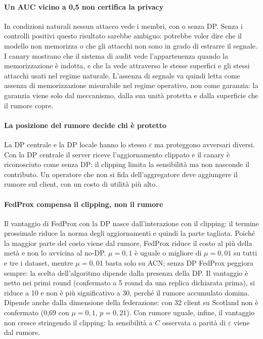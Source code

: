 \paragraph{Un AUC vicino a 0,5 non certifica la privacy}
In condizioni naturali nessun attacco vede i membri, con o senza DP. Senza i controlli positivi
questo risultato sarebbe ambiguo: potrebbe voler dire che il modello non memorizza o che gli
attacchi non sono in grado di estrarre il segnale. I canary mostrano che il sistema di audit
vede l'appartenenza quando la memorizzazione è indotta, e che la vede attraverso le stesse
superfici e gli stessi attacchi usati nel regime naturale. L'assenza di segnale va quindi letta
come assenza di memorizzazione misurabile nel regime operativo, non come garanzia: la garanzia
viene solo dal meccanismo, dalla sua unità protetta e dalla superficie che il rumore copre.

\paragraph{La posizione del rumore decide chi è protetto}
La DP centrale e la DP locale hanno lo stesso $\varepsilon$ ma proteggono avversari diversi.
Con la DP centrale il server riceve l'aggiornamento clippato e il canary è riconosciuto come
senza DP: il clipping limita la sensibilità ma non nasconde il contributo. Un operatore che
non si fida dell'aggregatore deve aggiungere il rumore sul client, con un costo di utilità
più alto.

\paragraph{FedProx compensa il clipping, non il rumore}
Il vantaggio di FedProx con la DP nasce dall'interazione con il clipping: il termine
prossimale riduce la norma degli aggiornamenti e quindi la parte tagliata. Poiché la maggior
parte del costo viene dal rumore, FedProx riduce il costo al più della metà e non lo avvicina
al no-DP. $\mu=0{,}1$ è uguale o migliore di $\mu=0{,}01$ su tutti e tre i dataset, mentre
$\mu=0{,}01$ basta solo su ACN; senza DP FedProx peggiora sempre: la scelta dell'algoritmo
dipende dalla presenza della DP. Il vantaggio è netto nei primi round (confermato a 5 round da
una replica dichiarata prima), si riduce a 10 e non è più significativo a 30, perché il rumore
accumulato domina. Dipende anche dalla dimensione della federazione: con 32 client su Scotland non
è confermato (0,69 con $\mu=0{,}1$, $p=0{,}21$). Con rumore uguale, infine, il vantaggio non cresce
stringendo il clipping: la sensibilità a $C$ osservata a parità di $\varepsilon$ viene dal rumore.

